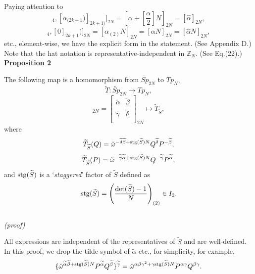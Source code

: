 \documentclass[12pt]{iopart}
\begin{document}
Paying attention to
\begin{equation}
[([\alpha_{(2)}]_4,[\alpha_{(2k+1})]_{2k+1)}]_{2N}
=\left[\alpha+\left[\frac\alpha2\right]N\right]_{2N}
=[\hat\alpha]_{2N},
\end{equation}
\begin{equation}
[([2\alpha_{(2)}]_4,[0]_{2k+1})]_{2N}
=[\alpha_{(2)}N]_{2N}
=[\alpha N]_{2N}
=[\hat\alpha N]_{2N},
\end{equation}
etc., element-wise, we have the explicit form in the statement.
(See Appendix D.)
Note that the hat notation is representative-independent in \(\mathbb Z_N\).
(See Eq.(22).)
\\

\noindent
{\bf Proposition 2}
\vspace{2mm}

The following map is a homomorphism from \(\widetilde{Sp}_{2N}\) to \(Tp_N\),
\begin{equation}
\widetilde T: \widetilde{Sp}_{2N}\longrightarrow Tp_N,
\end{equation}
\begin{equation}
[\widetilde S]_{2N}
=
\left[\begin{array}{cc}
\widetilde\alpha & \widetilde\beta \\
\widetilde\gamma & \widetilde\delta \\
\end{array}\right]_{2N}
\longmapsto
\widetilde T_{\widetilde S},
\end{equation}
where
\begin{equation}
\widetilde T_{\widetilde S}(Q)
=
\check\omega^{-\widetilde\delta\widetilde\beta+{\rm stg}(\widetilde S)N}Q^{\widetilde\delta}P^{-\widetilde\beta},
\end{equation}
\begin{equation}
\widetilde T_{\widetilde S}(P)
=
\check\omega^{-\widetilde\gamma\widetilde\alpha+{\rm stg}(\widetilde S)N}Q^{-\widetilde\gamma}P^{\widetilde\alpha},
\end{equation}
and
\({\rm stg}(\widetilde S)\) is a `{\it staggered}' factor of \(\widetilde S\) defined as
\begin{equation}
{\rm stg}(\widetilde S)=\left(\frac{{\rm det}(\widetilde S)-1}N\right)_{(2)}\in I_2.
\end{equation}
\ \\

\noindent
{\it (proof)}

All expressions are independent of the representatives of \(\widetilde S\) and are well-defined.
In this proof, we drop the tilde symbol of \(\widetilde\alpha\) etc., for simplicity,
%
for example,
\begin{equation}
\{\check\omega^{\widetilde\alpha\widetilde\beta+{\rm stg}(\widetilde S)N}P^{\widetilde\alpha}Q^{\widetilde\beta}\}^{\widetilde\gamma}
=
\check\omega^{\alpha\beta\gamma^2+\gamma{\rm stg}(\widetilde S)N}P^{\alpha\gamma}Q^{\beta\gamma}.
\end{equation}
\end{document}
